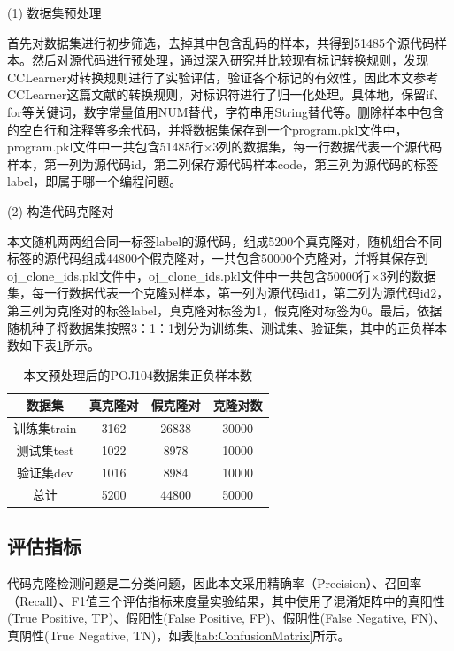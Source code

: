 (1) 数据集预处理

首先对数据集进行初步筛选，去掉其中包含乱码的样本，共得到51485个源代码样本。然后对源代码进行预处理，通过深入研究并比较现有标记转换规则，发现CCLearner\cite{10.1145/1287624.1287634}对转换规则进行了实验评估，验证各个标记的有效性，因此本文参考CCLearner\cite{10.1145/1287624.1287634}这篇文献的转换规则，对标识符进行了归一化处理。具体地，保留if、for等关键词，数字常量值用NUM替代，字符串用String替代等。删除样本中包含的空白行和注释等多余代码，并将数据集保存到一个program.pkl文件中，program.pkl文件中一共包含51485行×3列的数据集，每一行数据代表一个源代码样本，第一列为源代码id，第二列保存源代码样本code，第三列为源代码的标签label，即属于哪一个编程问题。

(2) 构造代码克隆对

本文随机两两组合同一标签label的源代码，组成5200个真克隆对，随机组合不同标签的源代码组成44800个假克隆对，一共包含50000个克隆对，并将其保存到oj\_clone\_ids.pkl文件中，oj\_clone\_ids.pkl文件中一共包含50000行×3列的数据集，每一行数据代表一个克隆对样本，第一列为源代码id1，第二列为源代码id2，第三列为克隆对的标签label，真克隆对标签为1，假克隆对标签为0。最后，依据随机种子将数据集按照3：1：1划分为训练集、测试集、验证集，其中的正负样本数如下表\ref{tab:ClonePairs}所示。

\begin{table}[htp]
  \centering
  \caption{本文预处理后的POJ104数据集正负样本数} 
  \label{tab:ClonePairs}
  \renewcommand{\arraystretch}{1.1}
  \begin{tabular*}{0.8\textwidth}{@{\extracolsep{\fill}}cccc}
  \toprule
    数据集			&真克隆对		&假克隆对		&克隆对数 \\
  \midrule
    训练集train			&3162	  &26838		&30000 \\
    测试集test			&1022		&8978		  &10000 \\
    验证集dev			  &1016		&8984		  &10000 \\
    总计            &5200	  &44800	  &50000 \\
  \bottomrule
  \end{tabular*}
\end{table}

\subsection{评估指标}
\label{subsec:Index}
代码克隆检测问题是二分类问题，因此本文采用精确率（Precision）、召回率（Recall）、F1值三个评估指标来度量实验结果，其中使用了混淆矩阵中的真阳性(True Positive, TP)、假阳性(False Positive, FP)、假阴性(False Negative, FN)、真阴性(True Negative, TN)，如表\ref{tab:ConfusionMatrix}所示。

